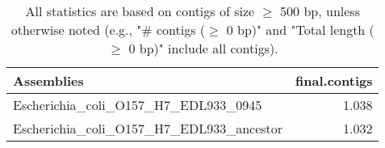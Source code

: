 \documentclass[12pt,a4paper]{article}
\begin{document}
\begin{table}[ht]
\begin{center}
\caption{All statistics are based on contigs of size $\geq$ 500 bp, unless otherwise noted (e.g., "\# contigs ($\geq$ 0 bp)" and "Total length ($\geq$ 0 bp)" include all contigs).}
\begin{tabular}{|l*{1}{|r}|}
\hline
Assemblies & final.contigs \\ \hline
Escherichia\_coli\_O157\_H7\_EDL933\_0945 & 1.038 \\ \hline
Escherichia\_coli\_O157\_H7\_EDL933\_ancestor & 1.032 \\ \hline
\end{tabular}
\end{center}
\end{table}
\end{document}
